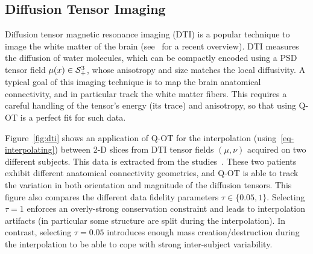 



\subsection{Diffusion Tensor Imaging}

Diffusion tensor magnetic resonance imaging (DTI) is a popular technique to image the white matter of the brain (see~\cite{wandell2016clarifying} for a recent overview). DTI measures the diffusion of water molecules, which can be compactly encoded using a PSD tensor field $\mu(x) \in \mathcal{S}_+^3$, whose anisotropy and size matches the local diffusivity. 
%
A typical goal of this imaging technique is to map the brain anatomical connectivity, and in particular track the  white matter fibers. This requires a careful handling of the tensor's energy (its trace) and anisotropy, so that using Q-OT is a perfect fit for such data.

Figure~\ref{fig:dti} shows an application of Q-OT for the interpolation (using~\ref{eq-interpolating}) between 2-D slices from DTI tensor fields $(\mu,\nu)$ acquired on two different subjects. This data is extracted from the studies~\cite{pestilli2014evaluation,takemura2016ensemble}. These two patients exhibit different anatomical connectivity geometries, and Q-OT is able to track the variation in both orientation and magnitude of the diffusion tensors. This figure also compares the different data fidelity parameters $\tau \in \{0.05,1\}$. Selecting $\tau=1$ enforces an overly-strong conservation constraint and leads to interpolation artifacts (in particular some structure are split during the interpolation). In contrast, selecting $\tau=0.05$ introduces enough mass creation/destruction during the interpolation to be able to cope with strong inter-subject variability.

